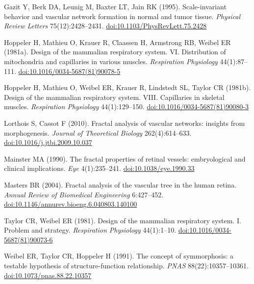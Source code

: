 \item Gazit Y, Berk DA, Leunig M, Baxter LT, Jain RK (1995). Scale-invariant behavior and vascular network formation in normal and tumor tissue. \emph{Physical Review Letters} 75(12):2428–2431. \href{https://doi.org/10.1103/PhysRevLett.75.2428}{doi:10.1103/PhysRevLett.75.2428}
\item Hoppeler H, Mathieu O, Krauer R, Claassen H, Armstrong RB, Weibel ER (1981a). Design of the mammalian respiratory system. VI. Distribution of mitochondria and capillaries in various muscles. \emph{Respiration Physiology} 44(1):87–111. \href{https://doi.org/10.1016/0034-5687(81)90078-5}{doi:10.1016/0034-5687(81)90078-5}
\item Hoppeler H, Mathieu O, Weibel ER, Krauer R, Lindstedt SL, Taylor CR (1981b). Design of the mammalian respiratory system. VIII. Capillaries in skeletal muscles. \emph{Respiration Physiology} 44(1):129–150. \href{https://doi.org/10.1016/0034-5687(81)90080-3}{doi:10.1016/0034-5687(81)90080-3}
\item Lorthois S, Cassot F (2010). Fractal analysis of vascular networks: insights from morphogenesis. \emph{Journal of Theoretical Biology} 262(4):614–633. \href{https://doi.org/10.1016/j.jtbi.2009.10.037}{doi:10.1016/j.jtbi.2009.10.037}
\item Mainster MA (1990). The fractal properties of retinal vessels: embryological and clinical implications. \emph{Eye} 4(1):235–241. \href{https://doi.org/10.1038/eye.1990.33}{doi:10.1038/eye.1990.33}
\item Masters BR (2004). Fractal analysis of the vascular tree in the human retina. \emph{Annual Review of Biomedical Engineering} 6:427–452. \href{https://doi.org/10.1146/annurev.bioeng.6.040803.140100}{doi:10.1146/annurev.bioeng.6.040803.140100}
\item Taylor CR, Weibel ER (1981). Design of the mammalian respiratory system. I. Problem and strategy. \emph{Respiration Physiology} 44(1):1–10. \href{https://doi.org/10.1016/0034-5687(81)90073-6}{doi:10.1016/0034-5687(81)90073-6}
\item Weibel ER, Taylor CR, Hoppeler H (1991). The concept of symmorphosis: a testable hypothesis of structure-function relationship. \emph{PNAS} 88(22):10357–10361. \href{https://doi.org/10.1073/pnas.88.22.10357}{doi:10.1073/pnas.88.22.10357}
